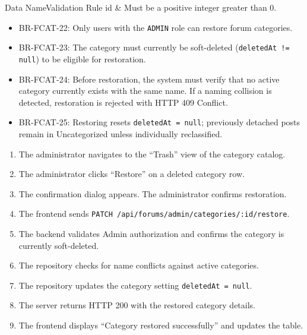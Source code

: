 \begin{specdatatable}{Data Name}{Validation Rule}
id & Must be a positive integer greater than 0.\\ \hline
\end{specdatatable}

\begin{itemize}[leftmargin=1.6em,topsep=3pt,itemsep=2pt,parsep=0pt,label=$\bullet$]\brrulelist
    \item BR-FCAT-22: Only users with the \texttt{ADMIN} role can restore forum categories.
    \item BR-FCAT-23: The category must currently be soft-deleted (\texttt{deletedAt != null}) to be eligible for restoration.
    \item BR-FCAT-24: Before restoration, the system must verify that no active category currently exists with the same name. If a naming collision is detected, restoration is rejected with HTTP 409 Conflict.
    \item BR-FCAT-25: Restoring resets \texttt{deletedAt = null}; previously detached posts remain in Uncategorized unless individually reclassified.
\end{itemize}

\begin{enumerate}[leftmargin=1.6em,topsep=3pt,itemsep=2pt,parsep=0pt]
    \item The administrator navigates to the ``Trash'' view of the category catalog.
    \item The administrator clicks ``Restore'' on a deleted category row.
    \item The confirmation dialog appears. The administrator confirms restoration.
    \item The frontend sends \texttt{PATCH /api/forums/admin/categories/:id/restore}.
    \item The backend validates Admin authorization and confirms the category is currently soft-deleted.
    \item The repository checks for name conflicts against active categories.
    \item The repository updates the category setting \texttt{deletedAt = null}.
    \item The server returns HTTP 200 with the restored category details.
    \item The frontend displays ``Category restored successfully'' and updates the table.
\end{enumerate}


